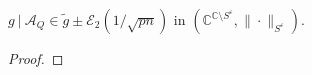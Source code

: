 \documentclass[a4papaer, titlepage]{book}
\begin{document}
\begin{theorem}\label{the:concentration_transformee_de_stieltjes_main_res}
$g \ | \ \mathcal A_Q \in \tilde g \pm \mathcal E_2 (1/\sqrt{pn})$ in $(\mathbb C^{\mathbb C \setminus S^\varepsilon}, \| \cdot \|_{S^\varepsilon})$.
\end{theorem}

\begin{proof}

\end{proof}
\end{document}
